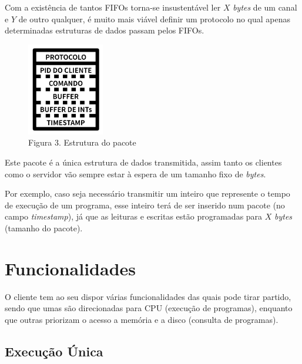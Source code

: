 \documentclass[12pt,a4paper]{report}
\begin{document}
        Com a existência de tantos FIFOs torna-se insustentável ler $X$ \textit{bytes} de um canal e $Y$ de outro qualquer, é muito mais viável definir um protocolo no qual apenas determinadas estruturas de dados passam pelos FIFOs.

        \begin{figure}
            \begin{center}
                \vspace{-22pt}
                \includegraphics[width=0.3\textwidth]{images/protocol.png}
                \caption*{Figura 3. Estrutura do pacote}
                \vspace{-30pt}
            \end{center}
        \end{figure}

        Este pacote é a única estrutura de dados transmitida, assim tanto os clientes como o servidor vão sempre estar à espera de um tamanho fixo de \textit{bytes}.

        Por exemplo, caso seja necessário transmitir um inteiro que represente o tempo de execução de um programa, esse inteiro terá de ser inserido num pacote (no campo \textit{timestamp}), já que as leituras e escritas estão programadas para $X$ \textit{bytes} (tamanho do pacote).


\chapter{Funcionalidades}

    O cliente tem ao seu dispor várias funcionalidades das quais pode tirar partido, sendo que umas são direcionadas para CPU (execução de programas), enquanto que outras priorizam o acesso a memória e a disco (consulta de programas).

    \section{Execução Única}
\end{document}
